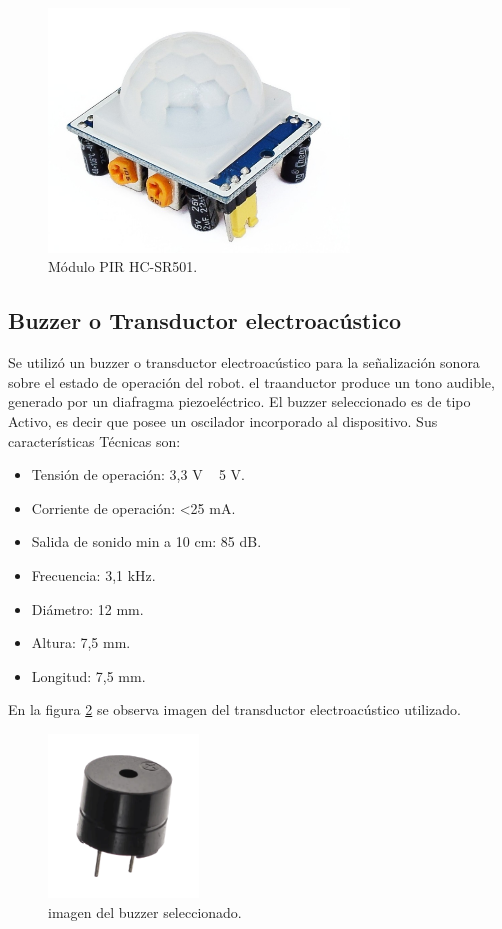 \begin{figure}[h]
	\centering
	\includegraphics[width=8cm]{./Figures/pir.PNG}
	\caption{Módulo PIR HC-SR501\protect\footnotemark.}
	\label{fig:pir}
\end{figure}



\subsection{Buzzer o Transductor electroacústico}

Se utilizó un buzzer o transductor electroacústico para la señalización sonora sobre el estado de operación del robot. el traanductor produce un tono audible, generado por un diafragma piezoeléctrico. 
El buzzer seleccionado es de tipo Activo, es decir que posee un oscilador incorporado al dispositivo. 
Sus características Técnicas son:

\begin{itemize}
	\item Tensión de operación: 3,3 V ~ 5 V.
	\item Corriente de operación: <25 mA.
	\item Salida de sonido min a 10 cm: 85 dB.
	\item Frecuencia: 3,1 kHz. 	
	\item Diámetro: 12 mm.
	\item Altura: 7,5 mm.
	\item Longitud: 7,5 mm.	
\end{itemize}


En la figura \ref{fig:buzzer2} se observa imagen del transductor electroacústico utilizado.

\begin{figure}[h]
	\centering
	\includegraphics[width=4cm]{./Figures/buzzer2.PNG}
	\caption{imagen del buzzer seleccionado\protect\footnotemark.}
	\label{fig:buzzer2}
\end{figure}


